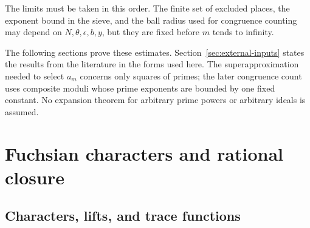 \documentclass[11pt,reqno]{amsart}
\theoremstyle{definition}
\theoremstyle{remark}
\begin{document}
The limits must be taken in this order.  The finite set of excluded
places, the exponent bound in the sieve, and the ball radius used for
congruence counting may depend on \(N,\theta,\epsilon,b,y\), but they are
fixed before \(m\) tends to infinity.

The following sections prove these estimates.  Section~\ref{sec:external-inputs}
states the results from the literature in the forms used here.  The
superapproximation needed to select \(a_m\) concerns only squares of
primes; the later congruence count uses composite moduli whose prime
exponents are bounded by one fixed constant.  No expansion theorem for
arbitrary prime powers or arbitrary ideals is assumed.

\section{Fuchsian characters and rational closure}
\label{sec:characters}

\subsection{Characters, lifts, and trace functions}
\end{document}
